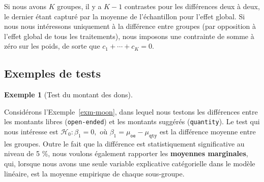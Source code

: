 \documentclass[
  11pt,
  letterpaper,
]{scrbook}
\theoremstyle{plain}
\theoremstyle{plain}
\theoremstyle{definition}
\newtheorem{example}{Exemple}[chapter]
\theoremstyle{definition}
\theoremstyle{remark}
\begin{document}
Si nous avons \(K\) groupes, il y a \(K-1\) contrastes pour les
différences deux à deux, le dernier étant capturé par la moyenne de
l'échantillon pour l'effet global. Si nous nous intéressons uniquement à
la différence entre groupes (par opposition à l'effet global de tous les
traitements), nous imposons une contrainte de somme à zéro sur les
poids, de sorte que \(c_1 + \cdots + c_K=0.\)

\subsection{Exemples de tests}\label{exemples-de-tests}

\begin{example}[Test du montant des
dons]\protect\hypertarget{exm-moonvaepps-test}{}\label{exm-moonvaepps-test}

Considérons l'Exemple~\ref{exm-moon}, dans lequel nous testons les
différences entre les montants libres (\texttt{open-ended}) et les
montants suggérés (\texttt{quantity}). Le test qui nous intéresse est
\(\mathscr{H}_0 : \beta_1=0,\) où
\(\beta_1=\mu_{\texttt{oe}} - \mu_{\texttt{qty}}\) est la différence
moyenne entre les groupes. Outre le fait que la différence est
statistiquement significative au niveau de 5 \%, nous voulons également
rapporter les \textbf{moyennes marginales}, qui, lorsque nous avons une
seule variable explicative catégorielle dans le modèle linéaire, est la
moyenne empirique de chaque sous-groupe.


\end{example}
\end{document}
